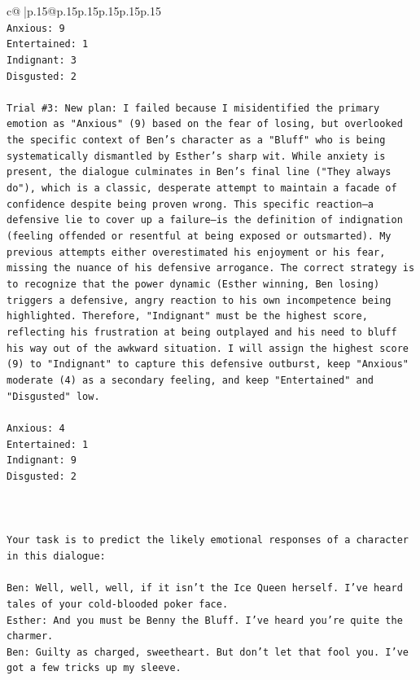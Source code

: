 \documentclass{article}
\begin{document}
{\begin{supertabular}{c@{$\;$}|p{.15\linewidth}@{}p{.15\linewidth}p{.15\linewidth}p{.15\linewidth}p{.15\linewidth}p{.15\linewidth}}
{{{\\ 
\texttt{Anxious: 9} \\
\texttt{Entertained: 1} \\
\texttt{Indignant: 3} \\
\texttt{Disgusted: 2} \\
\\ 
\texttt{Trial \#3: New plan: I failed because I misidentified the primary emotion as "Anxious" (9) based on the fear of losing, but overlooked the specific context of Ben's character as a "Bluff" who is being systematically dismantled by Esther's sharp wit. While anxiety is present, the dialogue culminates in Ben's final line ("They always do"), which is a classic, desperate attempt to maintain a facade of confidence despite being proven wrong. This specific reaction—a defensive lie to cover up a failure—is the definition of indignation (feeling offended or resentful at being exposed or outsmarted). My previous attempts either overestimated his enjoyment or his fear, missing the nuance of his defensive arrogance. The correct strategy is to recognize that the power dynamic (Esther winning, Ben losing) triggers a defensive, angry reaction to his own incompetence being highlighted. Therefore, "Indignant" must be the highest score, reflecting his frustration at being outplayed and his need to bluff his way out of the awkward situation. I will assign the highest score (9) to "Indignant" to capture this defensive outburst, keep "Anxious" moderate (4) as a secondary feeling, and keep "Entertained" and "Disgusted" low.} \\
\\ 
\texttt{Anxious: 4} \\
\texttt{Entertained: 1} \\
\texttt{Indignant: 9} \\
\texttt{Disgusted: 2} \\
\\ 
\\ 
\\ 
\texttt{Your task is to predict the likely emotional responses of a character in this dialogue:} \\
\\ 
\texttt{Ben: Well, well, well, if it isn't the Ice Queen herself. I've heard tales of your cold{-}blooded poker face.} \\
\texttt{Esther: And you must be Benny the Bluff. I've heard you're quite the charmer. } \\
\texttt{Ben: Guilty as charged, sweetheart. But don't let that fool you. I've got a few tricks up my sleeve.} \\
}}}
\end{supertabular}}
\end{document}
